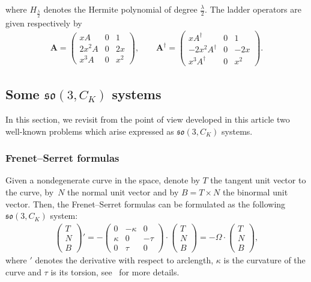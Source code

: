 \documentclass[pdftex]{sigma}%
\numberwithin{equation}{section}
\begin{document}
where $H_{\frac{\lambda}{2}}$ denotes the Hermite polynomial of degree $\frac{\lambda}{2}$. The ladder operators are given respectively by
\begin{gather*}
\mathbf{A}=\begin{pmatrix}
xA&0&1\\2x^2A&0&2x\\x^3A&0&x^2
\end{pmatrix}\!, \qquad
\mathbf{A}^\dag=\begin{pmatrix}
xA^\dag&0&1\\-2x^2A^\dag&0&-2x\\x^3A^\dag&0&x^2
\end{pmatrix}\!.
\end{gather*}

\subsection{Some \texorpdfstring{$\mathfrak{so}(3, C_K)$}{so(3,C\_K)} systems}\label{sec:applic-so3}

In this section, we revisit from the point of view developed in this article two well-known problems which arise expressed as $\mathfrak{so}(3, C_K)$ systems.


\subsubsection{Frenet--Serret formulas}

Given a nondegenerate curve in the space, denote by $T$ the tangent unit vector to the curve, by~$N$ the normal unit vector and by $B = T \times N$ the binormal unit vector. Then, the Frenet--Serret formulas can be formulated as the following $\mathfrak{so}(3, C_K)$ system:
\begin{gather}
\begin{pmatrix} T \\ N \\ B \end{pmatrix}' = - \begin{pmatrix}
0 & -\kappa & 0 \\ \kappa & 0 & - \tau \\ 0 & \tau & 0 \end{pmatrix} \cdot
\begin{pmatrix} T \\ N \\ B \end{pmatrix} = - \Omega \cdot \begin{pmatrix} T \\ N \\ B \end{pmatrix}\!,
\end{gather}
where $'$ denotes the derivative with respect to arclength, $\kappa$ is the curvature of the curve and $\tau$ is its torsion, see~\cite[Chapter~1]{MSp} for more details.
\end{document}
